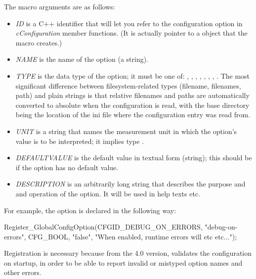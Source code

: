 The macro arguments are as follows:
\begin{itemize}
  \item \textit{ID} is a C++ identifier that will let you refer to
        the configuration option in \textit{cConfiguration} member functions.
        (It is actually pointer to a  object that
        the macro creates.)
  \item \textit{NAME} is the name of the option (a string).
  \item \textit{TYPE} is the data type of the option; it must be one of:
        , , , ,
        , , , .
        The most significant difference between filesystem-related types
        (filename, filenames, path) and plain strings is that relative
        filenames and paths are automatically converted to absolute
        when the configuration is read, with the base directory being the
        location of the ini file where the configuration entry was read from.
  \item \textit{UNIT} is a string that names the measurement unit in which
        the option's value is to be interpreted; it implies type .
  \item \textit{DEFAULTVALUE} is the default value in textual form (string);
        this should be  if the option has no default value.
  \item \textit{DESCRIPTION} is an arbitrarily long string that describes
        the purpose and and operation of the option. It will be used in
        help texts etc.
\end{itemize}

For example, the  option is declared in the following way:

\begin{cpp}
Register_GlobalConfigOption(CFGID_DEBUG_ON_ERRORS,
                            "debug-on-errors", CFG_BOOL, "false",
                            "When enabled, runtime errors will etc etc...");
\end{cpp}

\begin{note}
Registration is necessary because from the 4.0 version, {\opp} validates
the configuration on startup, in order to be able to report invalid or
mistyped option names and other errors.
\end{note}



